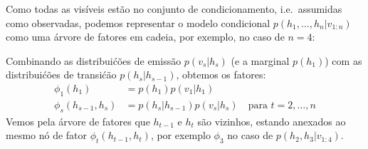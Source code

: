 \begin{exenumerate}
    \begin{solution}
        Como todas as vis\'iveis est\~ao no conjunto de condicionamento, i.e.\ assumidas
        como observadas, podemos representar o modelo condicional $p(h_1, \ldots,
        h_n|v_{1:n})$ como uma \'arvore de fatores em cadeia, por exemplo, no caso
        de $n=4$:
        \begin{center}
        \end{center}
        Combinando as distribui\'c\~oes de emiss\~ao $p(v_s|h_s)$ (e a marginal
        $p(h_1)$) com as distribui\'c\~oes de transi\'c\~ao $p(h_s|h_{s-1})$,
        obtemos os fatores:
        \begin{align}
            \phi_1(h_1) & = p(h_1) p(v_1|h_1)\\
            \phi_s(h_{s-1}, h_s) &= p(h_s|h_{s-1})p(v_s|h_s) \quad \text{para } t=2, \ldots, n
        \end{align}
        Vemos pela \'arvore de fatores que $h_{t-1}$ e $h_t$ s\~ao
        vizinhos, estando anexados ao mesmo n\'o de fator
        $\phi_t(h_{t-1}, h_t)$, por exemplo $\phi_3$ no caso de $p(h_{2}, h_3 | v_{1:4})$.
        

\end{solution}
\end{exenumerate}
